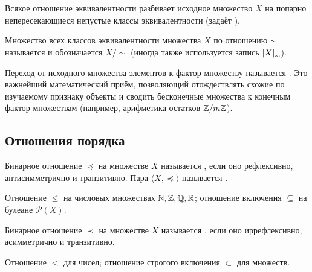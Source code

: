 \begin{corollary}
    Всякое отношение эквивалентности разбивает исходное множество $X$ на 
    попарно непересекающиеся непустые классы эквивалентности (задаёт 
    ).
\end{corollary}

\begin{definition}
    Множество всех классов эквивалентности множества $X$ по отношению 
    $\sim$ называется  и обозначается $X/{\sim}$ 
    (иногда также используется запись $\left| X \right|_\sim$).
\end{definition}

\begin{remark}
    Переход от исходного множества элементов к фактор-множеству называется 
    . Это важнейший математический приём, 
    позволяющий отождествлять схожие по изучаемому признаку объекты и 
    сводить бесконечные множества к конечным фактор-множествам (например, 
    арифметика остатков $\mathbb{Z} / m\mathbb{Z}$).
\end{remark}

\subsection{Отношения порядка}

\begin{definition}
    Бинарное отношение $\preceq$ на множестве $X$ называется 
    , если оно 
    рефлексивно, антисимметрично и транзитивно. Пара $\langle X, \preceq \rangle$ 
    называется .
\end{definition}

\begin{example}
    Отношение $\le$ на числовых множествах $\mathbb{N}, \mathbb{Z}, \mathbb{Q}, \mathbb{R}$; отношение 
    включения $\subseteq$ на булеане $\mathcal{P}(X)$.
\end{example}

\begin{definition}
    Бинарное отношение $\prec$ на множестве $X$ называется 
    , если оно 
    иррефлексивно, асимметрично и транзитивно.
\end{definition}

\begin{example}
    Отношение $<$ для чисел; отношение строгого включения $\subset$ для 
    множеств.
\end{example}

